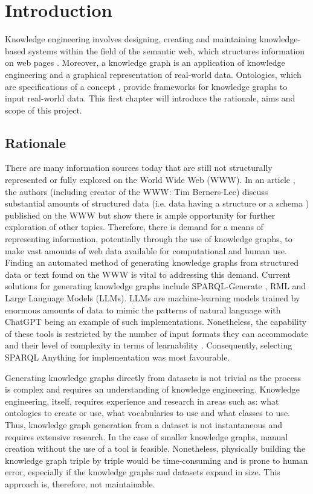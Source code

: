 \chapter{Introduction}
Knowledge engineering involves designing, creating and maintaining knowledge-based systems \cite{studer_benjamins_fensel_1998} within the field of the semantic web, which structures information on web pages \cite{berners2001semantic}. Moreover, a knowledge graph is an application of knowledge engineering and a graphical representation of real-world data. Ontologies, which are specifications of a concept \cite{Breitman2007}, provide frameworks for knowledge graphs to input real-world data. This first chapter will introduce the rationale, aims and scope of this project. 

\section{Rationale}
\hspace{0.5cm} There are many information sources today that are still not structurally represented or fully explored on the World Wide Web (WWW). In an article \cite{bizer2011linked}, the authors (including creator of the WWW: Tim Berners-Lee) discuss substantial amounts of structured data (i.e. data having a structure or a schema \cite{arasu_garcia-molina_university_2003}) published on the WWW but show there is ample opportunity for further exploration of other topics. Therefore, there is demand for a means of representing information, potentially through the use of knowledge graphs, to make vast amounts of web data available for computational and human use. Finding an automated method of generating knowledge graphs from structured data or text found on the WWW is vital to addressing this demand. Current solutions for generating knowledge graphs include SPARQL-Generate \cite{sparqlgenerate}, RML \cite{rml} and Large Language Models (LLMs). LLMs are machine-learning models trained by enormous amounts of data to mimic the patterns of natural language with ChatGPT \cite{chatgptwebsite} being an example of such implementations. Nonetheless, the capability of these tools is restricted by the number of input formats they can accommodate and their level of complexity in terms of learnability \cite{sparqlanything}. Consequently, selecting SPARQL Anything \cite{sparqlanythinggithub} for implementation was most favourable. 

Generating knowledge graphs directly from datasets is not trivial as the process is complex and requires an understanding of knowledge engineering. Knowledge engineering, itself, requires experience and research in areas such as: what ontologies to create or use, what vocabularies to use and what classes to use. Thus, knowledge graph generation from a dataset is not instantaneous and requires extensive research. In the case of smaller knowledge graphs, manual creation without the use of a tool is feasible. Nonetheless, physically building the knowledge graph triple by triple would be time-consuming and is prone to human error, especially if the knowledge graphs and datasets expand in size. This approach is, therefore, not maintainable. 

